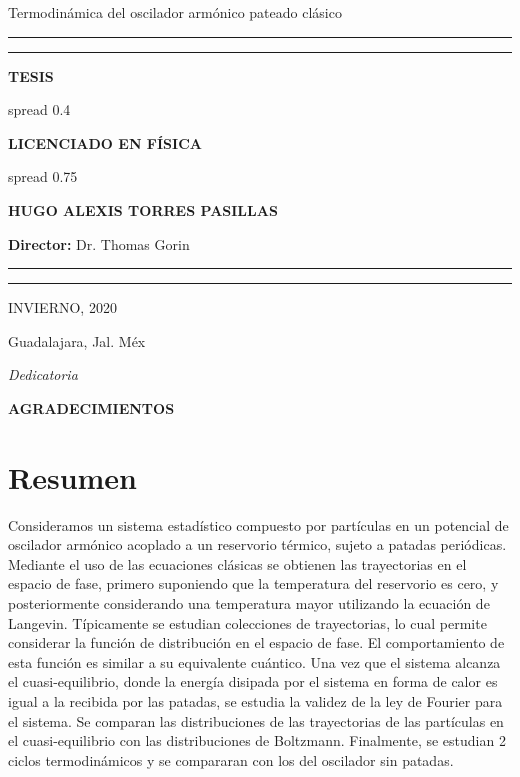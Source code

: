 \documentclass[letterpaper,12pt,oneside]{book}
\begin{document}
\begin{titlepage}
\begin{center}
			
		\huge{Termodinámica del oscilador armónico pateado clásico}
		
		\rule{1\textwidth}{7px}\vspace{-.8cm}
		\rule{1\textwidth}{3px}
		
		\Huge\textbf{TESIS}
		
		\hbox spread 0.4
		
		
		
		\Huge\textbf{LICENCIADO EN FÍSICA}
		
		\hbox spread 0.75
		
		
		\Huge\textbf{{HUGO ALEXIS TORRES PASILLAS}}
		
		\huge{\textbf{Director: }Dr. Thomas Gorin}
			
		\rule{1\textwidth}{7px}\vspace{-.75cm}
		\rule{1\textwidth}{3px}
		
		\end{center}
	
	\begin{flushright}
		\Large{INVIERNO, 2020}
	\end{flushright}
\vspace{-1.7cm}
	\begin{flushleft}
		\Large{Guadalajara, Jal. Méx}
	\end{flushleft}
		
	\end{titlepage}
	\renewcommand{\baselinestretch}{2}
	\pagenumbering{Roman}
	\doublespacing
	\begin{flushright}
		
		\large{\emph{Dedicatoria}}
	\thispagestyle{empty}
	\end{flushright}
	\newpage
	\thispagestyle{empty}

		{\huge \textbf{AGRADECIMIENTOS}}
		
	
	\newpage
	
	\chapter*{Resumen}
	
	Consideramos un sistema estadístico compuesto por partículas en un potencial de oscilador
	armónico acoplado a un reservorio térmico, sujeto a patadas periódicas. Mediante el uso de las
	ecuaciones clásicas se obtienen las trayectorias en el espacio de fase, primero suponiendo que la
	temperatura del reservorio es cero, y posteriormente considerando una temperatura mayor utilizando la ecuación de Langevin. Típicamente se estudian colecciones de trayectorias, lo cual permite
	considerar la función de distribución en el espacio de fase. El comportamiento de esta función
	es similar a su equivalente cuántico. Una vez que el sistema alcanza el cuasi-equilibrio, donde la
	energía disipada por el sistema en forma de calor es igual a la recibida por las patadas, se estudia	la validez de la ley de Fourier para el sistema. Se comparan las distribuciones de las trayectorias de	las partículas en el cuasi-equilibrio con las distribuciones de Boltzmann. Finalmente, se estudian 2 ciclos termodinámicos y se compararan con los del oscilador sin patadas.
	
\end{document}
